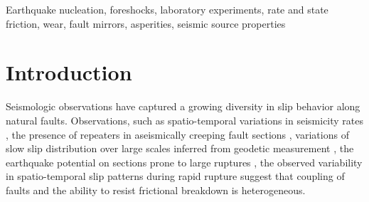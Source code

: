 \documentclass[preprint,1p, 10pt,authoryear]{elsarticle}
\begin{document}
\begin{frontmatter}


\begin{keyword}
Earthquake nucleation, foreshocks, laboratory experiments, rate and state friction, wear, fault mirrors, asperities, seismic source properties
\end{keyword}

\end{frontmatter}
\doublespacing



\section{Introduction}
\label{int}
Seismologic observations have captured a growing diversity in slip behavior along natural faults. Observations, such as spatio-temporal variations in seismicity rates \citep{Tormann2014, Tormann2015, Gulia2016,Gulia2019}, the presence of repeaters in aseismically creeping fault sections \citep[e.g.][]{Nadeau1994, Nadeau1999, Shirzaei2013, Uchida2019}, variations of slow slip distribution over large scales inferred from geodetic measurement  \citep[e.g.][]{Brodsky2014, Ruiz2014, Socquet2017}, the earthquake potential on sections prone to large ruptures \citep{Buergmann2000,Buergmann2004}, the observed variability in spatio-temporal slip patterns during rapid rupture \citep[e.g.][]{Mai2002, Tinti2005, Dreger2007, Galvez2016, Mai2018} suggest that coupling of faults and the ability to resist frictional breakdown is heterogeneous. 
\end{document}

